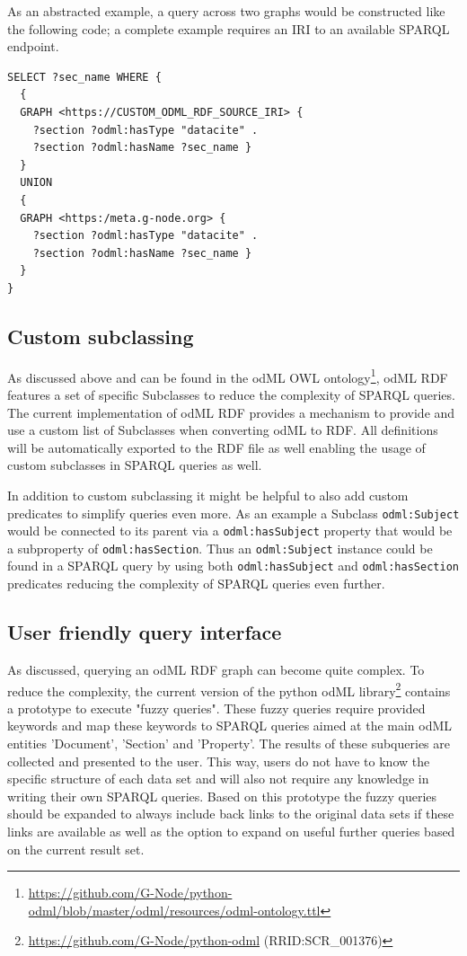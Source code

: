 \documentclass{article}
\begin{document}
As an abstracted example, a query across two graphs would be constructed like the following code; a complete example requires an IRI to an available SPARQL endpoint.

\begin{lstlisting}[label=lst:multi_graph, caption=Abstract multiple graph query, basicstyle=\small]
SELECT ?sec_name WHERE {
  {
  GRAPH <https://CUSTOM_ODML_RDF_SOURCE_IRI> {
    ?section ?odml:hasType "datacite" .
    ?section ?odml:hasName ?sec_name }
  }
  UNION
  {
  GRAPH <https:/meta.g-node.org> {
    ?section ?odml:hasType "datacite" .
    ?section ?odml:hasName ?sec_name }
  }
}
\end{lstlisting}

\subsection{Custom subclassing}\label{sec:outlook_subclassing}
As discussed above and can be found in the odML OWL ontology\footnote{\url{https://github.com/G-Node/python-odml/blob/master/odml/resources/odml-ontology.ttl}}, odML RDF features a set of specific Subclasses to reduce the complexity of SPARQL queries. The current implementation of odML RDF provides a mechanism to provide and use a custom list of Subclasses when converting odML to RDF. All definitions will be automatically exported to the RDF file as well enabling the usage of custom subclasses in SPARQL queries as well.

In addition to custom subclassing it might be helpful to also add custom predicates to simplify queries even more. As an example a Subclass \texttt{odml:Subject} would be connected to its parent via a \texttt{odml:hasSubject} property that would be a subproperty of \texttt{odml:hasSection}. Thus an \texttt{odml:Subject} instance could be found in a SPARQL query by using both \texttt{odml:hasSubject} and \texttt{odml:hasSection} predicates reducing the complexity of SPARQL queries even further.

\subsection{User friendly query interface}\label{sec:outlook_fuzzy_queries}
As discussed, querying an odML RDF graph can become quite complex. To reduce the complexity, the current version of the python odML library\footnote{\url{https://github.com/G-Node/python-odml} (RRID:SCR\_001376)} contains a prototype to execute "fuzzy queries". These fuzzy queries require provided keywords and map these keywords to SPARQL queries aimed at the main odML entities 'Document', 'Section' and 'Property'. The results of these subqueries are collected and presented to the user. This way, users do not have to know the specific structure of each data set and will also not require any knowledge in writing their own SPARQL queries. Based on this prototype the fuzzy queries should be expanded to always include back links to the original data sets if these links are available as well as the option to expand on useful further queries based on the current result set.
\end{document}
